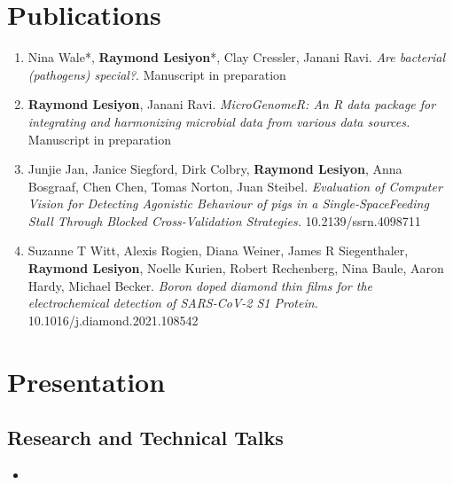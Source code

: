 \documentclass[12pt,a4paper,sans]{moderncv} %
\begin{document}
\section{Publications}

\begin{enumerate}
    \item Nina Wale*, \textbf{Raymond Lesiyon}*, Clay Cressler, Janani Ravi. \textit{Are bacterial (pathogens) special?}. Manuscript in preparation
    \item \textbf{Raymond Lesiyon}, Janani Ravi. \textit{MicroGenomeR: An R data package for integrating and harmonizing microbial data from various data sources.} Manuscript in preparation
    \item Junjie Jan, Janice Siegford, Dirk Colbry, \textbf{Raymond Lesiyon}, Anna Bosgraaf, Chen Chen, Tomas Norton, Juan Steibel. \textit{Evaluation of Computer Vision for Detecting Agonistic Behaviour of pigs in a Single-SpaceFeeding Stall Through Blocked Cross-Validation Strategies.} 10.2139/ssrn.4098711
    \item Suzanne T Witt, Alexis Rogien, Diana Weiner, James R Siegenthaler, \textbf{Raymond Lesiyon}, Noelle Kurien, Robert Rechenberg, Nina Baule, Aaron Hardy, Michael Becker. \textit{Boron doped diamond thin films for the electrochemical detection of SARS-CoV-2 S1 Protein.} 10.1016/j.diamond.2021.108542
\end{enumerate}


\section{Presentation}

\subsection{Research and Technical Talks} 
{
    \begin{itemize}
        \item { }
    \end{itemize}
}
\end{document}
